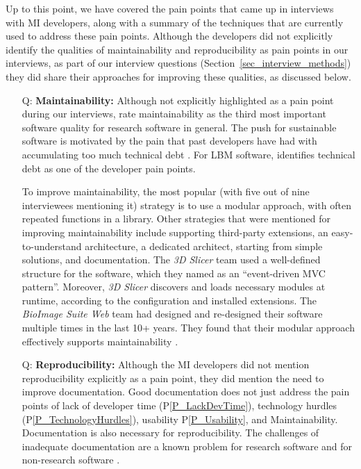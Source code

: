 \documentclass[final, 3p, times, authoryear]{elsarticle}
\newcommand{\ppref}[1]{P\ref{#1}}
\newcounter{qnum} %
\begin{document}
Up to this point, we have covered the pain points that came up in interviews
with MI developers, along with a summary of the techniques that are currently
used to address these pain points.  Although the developers did not explicitly
identify the qualities of maintainability and reproducibility as pain points in
our interviews, as part of our interview questions
(Section~\ref{sec_interview_methods}) they did share their approaches for
improving these qualities, as discussed below.

\begin{enumerate}
\item[Q\refstepcounter{qnum}\theqnum \label{Q_Maintainability}:]
\textbf{Maintainability:} Although not explicitly highlighted as a pain point
during our interviews, \citet{Nguyen-HoanEtAl2010} rate maintainability as the
third most important software quality for research software in general. The push
for sustainable software \citep{deSouzaEtAl2019} is motivated by the pain that
past developers have had with accumulating too much technical debt
\citep{KruchtenEtAl2012}.  For LBM software, \citet{SmithEtAl2022} identifies
technical debt as one of the developer pain points.

To improve maintainability, the most popular (with five out of nine interviewees
mentioning it) strategy is to use a modular approach, with often repeated
functions in a library.  Other strategies that were mentioned for improving
maintainability include supporting third-party extensions, an easy-to-understand
architecture, a dedicated architect, starting from simple solutions, and
documentation.  The \textit{3D Slicer} team used a well-defined structure for
the software, which they named as an ``event-driven MVC pattern''. Moreover,
\textit{3D Slicer} discovers and loads necessary modules at runtime, according
to the configuration and installed extensions. The \textit{BioImage Suite Web}
team had designed and re-designed their software multiple times in the last 10+
years. They found that their modular approach effectively supports
maintainability \citep{Joshi2011}. 

\item[Q\refstepcounter{qnum}\theqnum \label{Q_Reproducibility}:]
\textbf{Reproducibility:}  Although the MI developers did not mention
reproducibility explicitly as a pain point, they did mention the need to improve
documentation.  Good documentation does not just address the pain points of lack
of developer time (\ppref{P_LackDevTime}), technology hurdles
(\ppref{P_TechnologyHurdles}), usability \ppref{P_Usability}, and
Maintainability.  Documentation is also necessary for reproducibility. The
challenges of inadequate documentation are a known problem for research software
\citep{PintoEtAl2018, WieseEtAl2019} and for non-research software
\citep{LethbridgeEtAl2003}. 


\end{enumerate}
\end{document}
